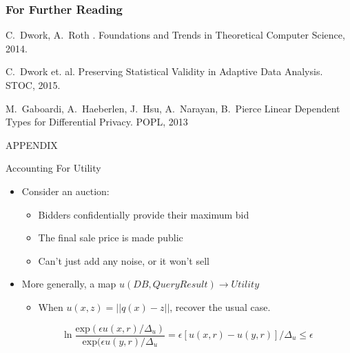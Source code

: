 \documentclass{beamer}
\begin{document}
\begin{frame}
  \frametitle<presentation>{For Further Reading}

  \begin{thebibliography}{10}

  \beamertemplatebookbibitems

    C.~Dwork, A.~Roth
    .
    \newblock Foundations and Trends in Theoretical Computer Science, 2014.


  \beamertemplatearticlebibitems

    C.~Dwork et. al.
    \newblock Preserving Statistical Validity in Adaptive Data Analysis.
    \newblock STOC, 2015.

  M.~Gaboardi, A.~Haeberlen, J.~Hsu, A.~Narayan, B.~Pierce
  \newblock Linear Dependent Types for Differential Privacy.
  \newblock POPL, 2013
  \end{thebibliography}
\end{frame}

\begin{frame}{APPENDIX}

\end{frame}

\begin{frame}{Accounting For Utility}
  \begin{itemize}
    \item Consider an auction: \begin{itemize}
      \item Bidders confidentially provide their maximum bid
      \item The final sale price is made public
      \item Can't just add any noise, or it won't sell
    \end{itemize}
    \item More generally, a map $u(DB,QueryResult) \to Utility$ \begin{itemize}
      \item When $u(x,z) = ||q(x)-z||$, recover the usual case.
    \end{itemize}
    \[\ln{\frac{\mbox{exp}(\epsilon u(x,r)/\Delta_u)}{\mbox{exp}(\epsilon u(y,r)/\Delta_u}} = \epsilon [u(x,r)-u(y,r)]/\Delta_u \leq \epsilon\]
  \end{itemize}
\end{frame}
\end{document}
